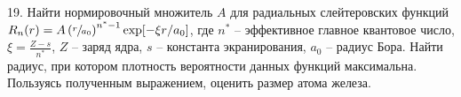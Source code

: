 \par
19. Найти нормировочный множитель $A$ для радиальных слейтеровских функций $R_n(r)=A\left( \sfrac{r}{a_0} \right) ^{n^*-1}\exp[-\xi r/ a_0]$, где $n^*$ – эффективное главное квантовое число, $\xi=\frac{Z-s}{n^*}$, $Z$ – заряд ядра, $s$ – константа экранирования, $a_0$ – радиус Бора. Найти радиус, при котором плотность вероятности данных функций максимальна. Пользуясь полученным выражением, оценить размер атома железа.
\par
